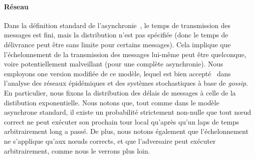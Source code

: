 \documentclass[letterpaper,twocolumn,10pt]{article}
\theoremstyle{definition}
\begin{document}
\paragraph{Réseau} 
Dans la définition standard de l'asynchronie~\cite{ben1983another}, le temps de transmission des messages est fini, mais la distribution n'est pas spécifiée (donc le temps de délivrance peut être sans limite pour certains messages). Cela implique que l'échelonnement de la transmission des messages lui-même peut être quelconque, voire potentiellement malveillant (pour une complète asynchronie).
Nous employons one version modifiée de ce modèle, lequel est bien accepté~\cite{banerjee2014epidemic, ganesh2005effect, draief2006thresholds, keeling2011modeling, liggett1997stochastic} dans l'analyse des réseaux épidémiques et des systèmes stochastiques à base de \emph{gossip}. En particulier, nous fixons la distribution des délais de messages à celle de la distibution exponentielle.
Nous notons que, tout comme dans le modèle asynchrone standard, il existe un probabilité strictement non-nulle que tout nœud correct ne peut exécuter son prochain tour local qu'après qu'un laps de temps arbitrairement long a passé.
De plus, nous notons également que l'échelonnement ne s'applique qu'aux nœuds corrects, et que l'adversaire peut exécuter arbitrairement, comme nous le verrons plus loin. %
\end{document}
